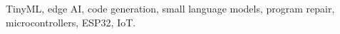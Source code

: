TinyML, edge AI, code generation, small language models, program repair, microcontrollers, ESP32, IoT.
